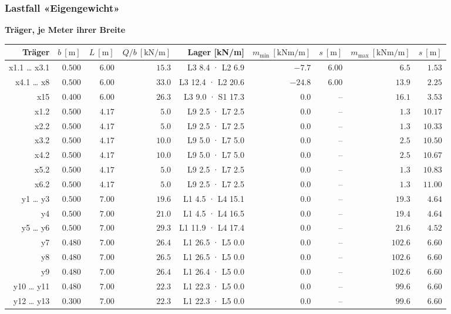 \documentclass[11pt,a4paper]{article}
\begin{document}
\subsubsection{Lastfall «Eigengewicht»}
\noindent\textbf{Träger, je Meter ihrer Breite}
\begin{longtable}{rrrrrrrrr}
\hline
Träger & $b\ [\mathrm{m}]$ & $L\ [\mathrm{m}]$ & $Q/b\ [\mathrm{kN/m}]$ & Lager [kN/m] & $m_{\min}\ [\mathrm{kNm/m}]$ & $s\ [\mathrm{m}]$ & $m_{\max}\ [\mathrm{kNm/m}]$ & $s\ [\mathrm{m}]$ \\
\hline
\endhead
x1.1 … x3.1 & $0.500$ & $6.00$ & $15.3$ & L3 8.4 · L2 6.9 & $-7.7$ & $6.00$ & $6.5$ & $1.53$ \\
x4.1 … x8 & $0.500$ & $6.00$ & $33.0$ & L3 12.4 · L2 20.6 & $-24.8$ & $6.00$ & $13.9$ & $2.25$ \\
x15 & $0.400$ & $6.00$ & $26.3$ & L3 9.0 · S1 17.3 & $0.0$ & – & $16.1$ & $3.53$ \\
x1.2 & $0.500$ & $4.17$ & $5.0$ & L9 2.5 · L7 2.5 & $0.0$ & – & $1.3$ & $10.17$ \\
x2.2 & $0.500$ & $4.17$ & $5.0$ & L9 2.5 · L7 2.5 & $0.0$ & – & $1.3$ & $10.33$ \\
x3.2 & $0.500$ & $4.17$ & $10.0$ & L9 5.0 · L7 5.0 & $0.0$ & – & $2.5$ & $10.50$ \\
x4.2 & $0.500$ & $4.17$ & $10.0$ & L9 5.0 · L7 5.0 & $0.0$ & – & $2.5$ & $10.67$ \\
x5.2 & $0.500$ & $4.17$ & $5.0$ & L9 2.5 · L7 2.5 & $0.0$ & – & $1.3$ & $10.83$ \\
x6.2 & $0.500$ & $4.17$ & $5.0$ & L9 2.5 · L7 2.5 & $0.0$ & – & $1.3$ & $11.00$ \\
y1 … y3 & $0.500$ & $7.00$ & $19.6$ & L1 4.5 · L4 15.1 & $0.0$ & – & $19.3$ & $4.64$ \\
y4 & $0.500$ & $7.00$ & $21.0$ & L1 4.5 · L4 16.5 & $0.0$ & – & $19.4$ & $4.64$ \\
y5 … y6 & $0.500$ & $7.00$ & $29.3$ & L1 11.9 · L4 17.4 & $0.0$ & – & $21.6$ & $4.52$ \\
y7 & $0.480$ & $7.00$ & $26.4$ & L1 26.5 · L5 0.0 & $0.0$ & – & $102.6$ & $6.60$ \\
y8 & $0.480$ & $7.00$ & $26.5$ & L1 26.5 · L5 0.0 & $0.0$ & – & $102.6$ & $6.60$ \\
y9 & $0.480$ & $7.00$ & $26.4$ & L1 26.4 · L5 0.0 & $0.0$ & – & $102.6$ & $6.60$ \\
y10 … y11 & $0.480$ & $7.00$ & $22.3$ & L1 22.3 · L5 0.0 & $0.0$ & – & $99.6$ & $6.60$ \\
y12 … y13 & $0.300$ & $7.00$ & $22.3$ & L1 22.3 · L5 0.0 & $0.0$ & – & $99.6$ & $6.60$ \\

\end{longtable}
\end{document}
